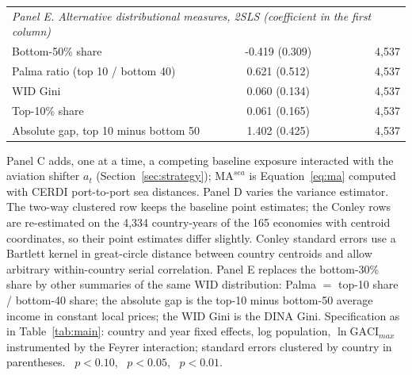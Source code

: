 \begin{table}[p]
\begin{minipage}{\linewidth}
{\begin{tabular}{lcccrr}
\multicolumn{6}{l}{\emph{Panel E. Alternative distributional measures, 2SLS (coefficient in the first column)}}\\
Bottom-50\% share & -0.419 (0.309) & & & & 4{,}537 \\
Palma ratio (top 10 / bottom 40) & 0.621 (0.512) & & & & 4{,}537 \\
WID Gini & 0.060 (0.134) & & & & 4{,}537 \\
Top-10\% share & 0.061 (0.165) & & & & 4{,}537 \\
Absolute gap, top 10 minus bottom 50 & 1.402\sym{***} (0.425) & & & & 4{,}537 \\
\bottomrule
\end{tabular}}
\par\vspace{3pt}\begin{flushleft}\footnotesize Panel C adds, one at a time, a competing baseline exposure interacted with the aviation shifter $a_t$ (Section~\ref{sec:strategy}); $\mathrm{MA}^{sea}$ is Equation~\eqref{eq:ma} computed with CERDI port-to-port sea distances. Panel D varies the variance estimator. The two-way clustered row keeps the baseline point estimates; the Conley rows are re-estimated on the 4{,}334 country-years of the 165 economies with centroid coordinates, so their point estimates differ slightly. Conley standard errors use a Bartlett kernel in great-circle distance between country centroids and allow arbitrary within-country serial correlation. Panel E replaces the bottom-30\% share by other summaries of the same WID distribution: Palma $=$ top-10 share / bottom-40 share; the absolute gap is the top-10 minus bottom-50 average income in constant local prices; the WID Gini is the DINA Gini. Specification as in Table~\ref{tab:main}: country and year fixed effects, log population, $\ln\mathrm{GACI}_{max}$ instrumented by the Feyrer interaction; standard errors clustered by country in parentheses. \sym{*}~$p<0.10$, \sym{**}~$p<0.05$, \sym{***}~$p<0.01$.\end{flushleft}
\end{minipage}
\end{table}
